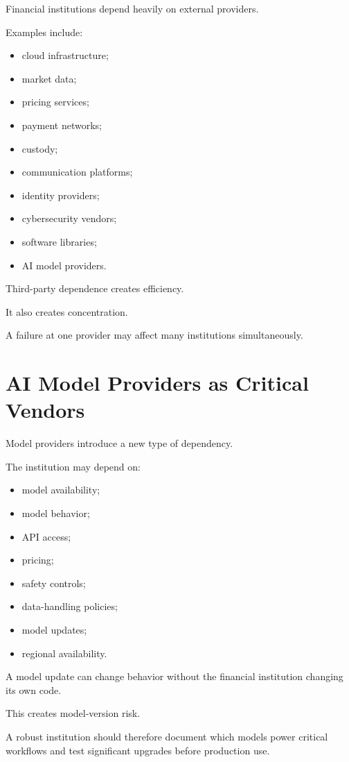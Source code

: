 Financial institutions depend heavily on external providers.

Examples include:

\begin{itemize}
    \item cloud infrastructure;
    \item market data;
    \item pricing services;
    \item payment networks;
    \item custody;
    \item communication platforms;
    \item identity providers;
    \item cybersecurity vendors;
    \item software libraries;
    \item AI model providers.
\end{itemize}

Third-party dependence creates efficiency.

It also creates concentration.

A failure at one provider may affect many institutions simultaneously.

\section{AI Model Providers as Critical Vendors}

Model providers introduce a new type of dependency.

The institution may depend on:

\begin{itemize}
    \item model availability;
    \item model behavior;
    \item API access;
    \item pricing;
    \item safety controls;
    \item data-handling policies;
    \item model updates;
    \item regional availability.
\end{itemize}

A model update can change behavior without the financial institution changing its own code.

This creates model-version risk.

A robust institution should therefore document which models power critical workflows and test significant upgrades before production use.

